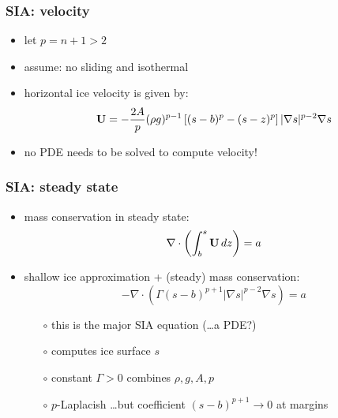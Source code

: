 \documentclass{beamer}
\newcommand{\Div}{\nabla\cdot}
\begin{document}
\begin{frame}
  \frametitle{SIA: velocity}
 
\begin{itemize}
\item let $p=n+1>2$
\item assume: no sliding and isothermal
\item horizontal ice velocity is given by: 
  $${\bf U}  =  - \frac{2 A}{p} (\rho g)^{p-1} \left[ (s-b)^p - (s - z)^p  \right] 
|\nabla s |^{p-2} \nabla s$$
\item no PDE needs to be solved to compute velocity!
\end{itemize}
\end{frame}


\begin{frame}
  \frametitle{SIA: steady state}

\begin{itemize}
\item mass conservation in steady state: 
  $$\Div \left(  \int_b^s {\bf U}\, dz \right)  =  a$$
\item shallow ice approximation + (steady) mass conservation:
  $$- \Div \left(\Gamma (s-b)^{p+1} | \nabla s |^{p-2} \nabla s  \right) =  a$$
  \begin{itemize}
  \vspace{-0.2in}
  \item[$\circ$] this is the major SIA equation (\dots a PDE?)
  \item[$\circ$] computes ice surface $s$
  \item[$\circ$] constant $\Gamma > 0$ combines $\rho,g,A,p$
  \item[$\circ$] $p$-Laplacish \dots but coefficient $(s-b)^{p+1} \to 0$ at margins
  \end{itemize}
\end{itemize}
\end{frame}
\end{document}
